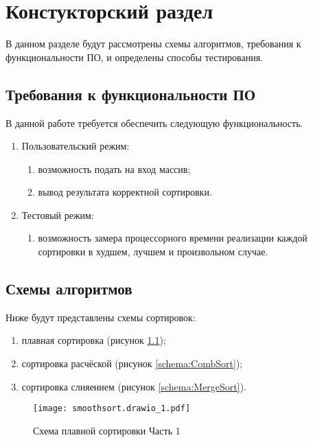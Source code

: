 \chapter{ Констукторский раздел}
\label{cha:design}
    В данном разделе будут рассмотрены схемы алгоритмов, требования к функциональности ПО, и определены способы тестирования.
    
    \section{Требования к функциональности ПО}
        В данной работе требуется обеспечить следующую функциональность.
        \begin{enumerate}
            \item Пользовательский режим:
            \begin{enumerate}
                \item возможность подать на вход массив;
                \item вывод результата корректной сортировки.
            \end{enumerate}
	\item Тестовый режим: 
            \begin{enumerate}
            	\item возможность замера процессорного времени реализации каждой сортировки в худшем, лучшем и произвольном случае.
            \end{enumerate}
        \end{enumerate}
	
	\section{Схемы алгоритмов}
        Ниже будут представлены схемы сортировок: \begin{enumerate}
            \item плавная сортировка (рисунок \ref{schema:SmoothSort_1});
            \item сортировка расчёской (рисунок \ref{schema:CombSort});
            \item сортировка слияением (рисунок \ref{schema:MergeSort}).
        \end{enumerate}
      
       	    \begin{figure}[h!]
       		\centering
       		\texttt{[image: smoothsort.drawio\_1.pdf]}
       		\caption{Схема плавной сортировки Часть 1}
       		\label{schema:SmoothSort_1}
       	\end{figure}\clearpage
       	
